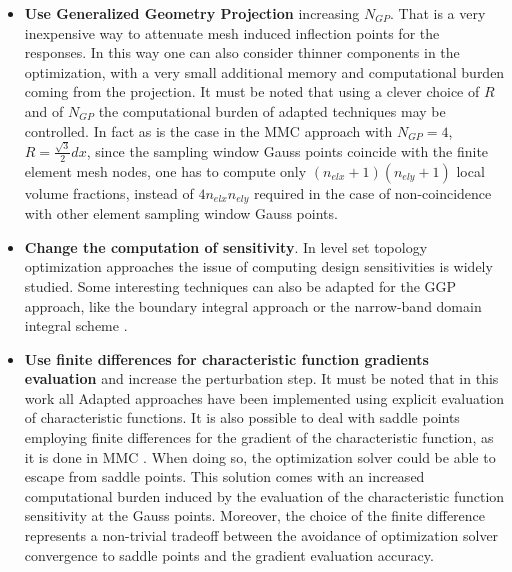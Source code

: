 \begin{itemize}
\item \textbf{Use Generalized Geometry Projection} increasing $N_{GP}$. That is a very inexpensive way to attenuate mesh induced inflection points for the responses. In this way one can also consider thinner components in the optimization, with a very small additional memory and computational burden coming from the projection. It must be noted that using a clever choice of $R$ and of $N_{GP}$ the computational burden of adapted techniques may be controlled. In fact as is the case in the MMC approach with $N_{GP}=4$, $R=\frac{\sqrt{3}}{2}dx$, since the sampling window Gauss points coincide with the finite element mesh nodes, one has to compute only $(n_{elx}+1)(n_{ely}+1)$ local volume fractions, instead of $4n_{elx}n_{ely}$ required in the case of non-coincidence with other element sampling window Gauss points.
\item \textbf{Change the computation of sensitivity}. In level set topology optimization approaches the issue of computing design sensitivities is widely studied. Some interesting techniques can also be adapted for the GGP approach, like the boundary integral approach \cite{cai2014stress} or  the narrow-band domain integral scheme \cite{zhou2016feature}.  
\item \textbf{Use finite differences for characteristic function gradients evaluation} and increase the perturbation step. It must be noted that in this work all Adapted approaches have been implemented using explicit evaluation of characteristic functions. It is also possible to deal with saddle points employing finite differences for the gradient of the characteristic function, as it is done in MMC \cite{zhang2016new}. When doing so, the optimization solver could be able to escape from saddle points. This solution comes with an increased computational burden induced by the evaluation of the characteristic function sensitivity at the Gauss points. Moreover, the choice of the finite difference represents a non-trivial tradeoff between the avoidance of optimization solver convergence to saddle points and the gradient evaluation accuracy.
\end{itemize}
